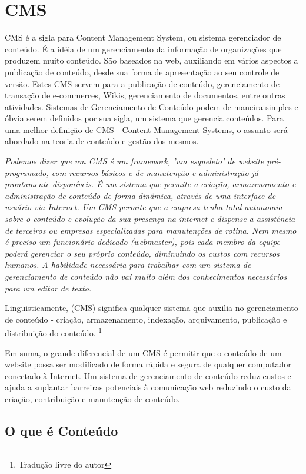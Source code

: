 \chapter{CMS}

CMS é a sigla para Content Management System, ou sistema gerenciador de conteúdo. É a idéia de um gerenciamento da informação de organizações que produzem muito conteúdo. São baseados na web, auxiliando em vários aspectos a publicação de conteúdo, desde sua forma de apresentação ao seu controle de versão. Estes CMS servem para a publicação de conteúdo, gerenciamento de transação de e-commerces, Wikis, gerenciamento de documentos, entre outras atividades. Sistemas de Gerenciamento de Conteúdo podem de maneira simples e óbvia serem definidos por sua sigla, um sistema que gerencia conteúdos. Para uma melhor definição de CMS - Content Management Systems, o assunto será abordado na teoria de conteúdo e gestão dos mesmos.

\emph{Podemos dizer que um CMS é um framework, 'um esqueleto' de website pré-programado, com recursos básicos e de manutenção e administração já prontamente disponíveis. É um sistema que permite a criação, armazenamento e administração de conteúdo de forma dinâmica, através de uma interface de usuário via Internet. Um CMS permite que a empresa tenha total autonomia sobre o conteúdo e evolução da sua presença na internet e dispense a assistência de terceiros ou empresas especializadas para manutenções de rotina. Nem mesmo é preciso um funcionário dedicado (webmaster), pois cada membro da equipe poderá gerenciar o seu próprio conteúdo, diminuindo os custos com recursos humanos. A habilidade necessária para trabalhar com um sistema de gerenciamento de conteúdo não vai muito além dos conhecimentos necessários para um editor de texto.} \cite{navita}

Linguisticamente, (CMS) significa qualquer sistema que auxilia no gerenciamento de conteúdo - criação, armazenamento, indexação, arquivamento, publicação e distribuição do conteúdo.
\cite{what_is_cms}\footnote{Tradução livre do autor}

Em suma, o grande diferencial de um CMS é permitir que o conteúdo de um website possa ser modificado de forma rápida e segura de qualquer computador conectado à Internet. Um sistema de gerenciamento de conteúdo reduz custos e ajuda a suplantar barreiras potenciais à comunicação web reduzindo o custo da criação, contribuição e manutenção de conteúdo.
\cite{navita}

\section{O que é Conteúdo}

